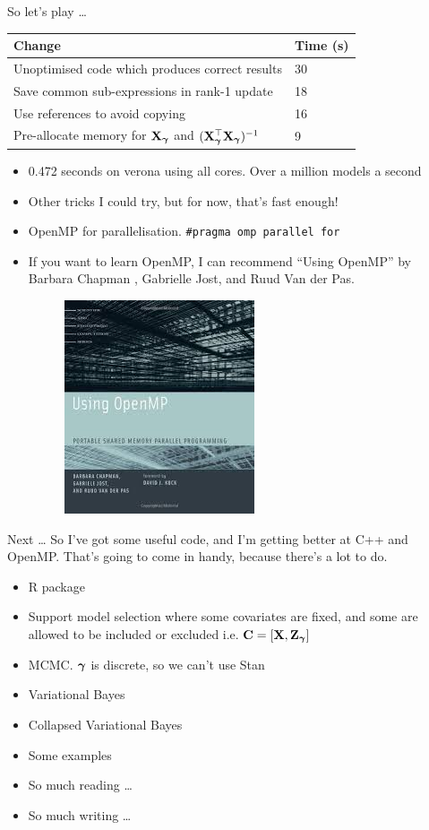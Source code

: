 \documentclass{beamer}
\begin{document}
\begin{frame}{So let's play \ldots}
\begin{tabular}{|p{9cm}l|}
\hline
Change & Time (s) \\
\hline
Unoptimised code which produces correct results & 30 \\
Save common sub-expressions in rank-1 update & 18 \\
Use references to avoid copying & 16 \\
Pre-allocate memory for ${\bf X}_{\boldsymbol \gamma}$ and $({\bf X}_{\boldsymbol \gamma}^\top {\bf X}_{\boldsymbol \gamma})^{-1}$ & 9 \\
\hline
\end{tabular}
\begin{itemize}
\item 0.472 seconds on verona using all cores. Over a million models a second
\item Other tricks I could try, but for now, that's fast enough!
\item OpenMP for parallelisation. \texttt{\#pragma omp parallel for}
\item If you want to learn OpenMP, I can recommend ``Using OpenMP'' by Barbara Chapman ,
		Gabrielle Jost, and Ruud Van der Pas.
\begin{figure}
\includegraphics[scale=0.3]{Using_OpenMP.jpeg}
\end{figure}
\end{itemize}
\end{frame}

\begin{frame}{Next \ldots}
So I've got some useful code, and I'm getting better at C++ and OpenMP. That's going to come in handy, 
because there's a lot to do.
\begin{itemize}
\item R package
\item Support model selection where some covariates are fixed, and some are allowed to be included or excluded
i.e. ${\bf C} = [{\bf X}, {\bf Z}_{\boldsymbol \gamma}]$
\item MCMC. ${\boldsymbol \gamma}$ is discrete, so we can't use Stan
\item Variational Bayes
\item Collapsed Variational Bayes
\item Some examples
\item So much reading \ldots
\item So much writing \ldots
\end{itemize}
\end{frame}
\end{document}
